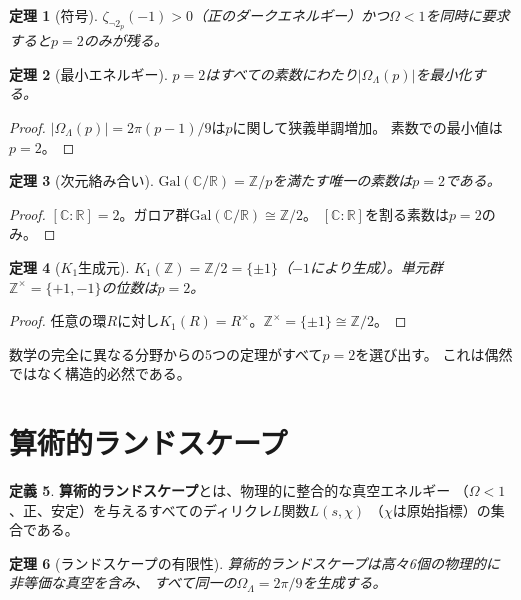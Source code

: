 \documentclass[12pt,a4paper]{article}
\newtheorem{theorem}{定理}[section]
\theoremstyle{definition}
\newtheorem{definition}[theorem]{定義}
\newcommand{\Gal}{\mathrm{Gal}}
\newcommand{\Z}{\mathbb{Z}}
\newcommand{\R}{\mathbb{R}}
\newcommand{\C}{\mathbb{C}}
\newcommand{\OmL}{\Omega_\Lambda}
\newcommand{\zetanot}{\zeta_{\neg 2}}
\begin{document}
\begin{theorem}[符号]\label{thm:sign}
$\zetanot_p(-1)>0$（正のダークエネルギー）かつ$\Omega<1$を同時に要求すると$p=2$のみが残る。
\end{theorem}

\begin{theorem}[最小エネルギー]\label{thm:min}
$p=2$はすべての素数にわたり$|\Omega_\Lambda(p)|$を最小化する。
\end{theorem}

\begin{proof}
$|\Omega_\Lambda(p)|=2\pi(p-1)/9$は$p$に関して狭義単調増加。
素数での最小値は$p=2$。
\end{proof}

\begin{theorem}[次元絡み合い]\label{thm:dim}
$\Gal(\C/\R)=\Z/p$を満たす唯一の素数は$p=2$である。
\end{theorem}

\begin{proof}
$[\C:\R]=2$。ガロア群$\Gal(\C/\R)\cong\Z/2$。
$[\C:\R]$を割る素数は$p=2$のみ。
\end{proof}

\begin{theorem}[$K_1$生成元]\label{thm:K1}
$K_1(\Z)=\Z/2=\{\pm 1\}$（$-1$により生成）。単元群$\Z^\times=\{+1,-1\}$の位数は$p=2$。
\end{theorem}

\begin{proof}
任意の環$R$に対し$K_1(R)=R^\times$。$\Z^\times=\{\pm 1\}\cong\Z/2$。
\end{proof}

数学の完全に異なる分野からの5つの定理がすべて$p=2$を選び出す。
これは偶然ではなく構造的必然である。

\section{算術的ランドスケープ}\label{sec:landscape}

\begin{definition}
\textbf{算術的ランドスケープ}とは、物理的に整合的な真空エネルギー
（$\Omega<1$、正、安定）を与えるすべてのディリクレ$L$関数$L(s,\chi)$
（$\chi$は原始指標）の集合である。
\end{definition}

\begin{theorem}[ランドスケープの有限性]\label{thm:landscape}
算術的ランドスケープは高々6個の物理的に非等価な真空を含み、
すべて同一の$\OmL=2\pi/9$を生成する。
\end{theorem}
\end{document}

